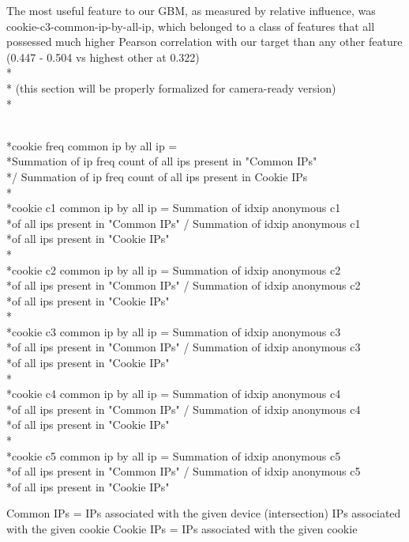 \documentclass[9pt, journal]{IEEEtran}
\begin{document}
The most useful feature to our GBM, as measured by relative influence, was cookie-c3-common-ip-by-all-ip, which belonged to a class of features that all possessed much higher Pearson correlation with our target than any other feature (0.447 - 0.504 vs highest other at 0.322)
\\*
\\* (this section will be properly formalized for camera-ready version)
\\*
\begin{footnotesize}
\\*cookie freq common ip by all ip = 
\\*Summation of ip freq count of all ips present in "Common IPs" 
\\*/ Summation of ip freq count of all ips present in Cookie IPs
\\*
\\*cookie c1 common ip by all ip = Summation of idxip anonymous c1 
\\*of all ips present in "Common IPs" / Summation of idxip anonymous c1 
\\*of all ips present in "Cookie IPs"
\\*
\\*cookie c2 common ip by all ip = Summation of idxip anonymous c2
\\*of all ips present in "Common IPs" / Summation of idxip anonymous c2
\\*of all ips present in "Cookie IPs"
\\*
\\*cookie c3 common ip by all ip = Summation of idxip anonymous c3
\\*of all ips present in "Common IPs" / Summation of idxip anonymous c3
\\*of all ips present in "Cookie IPs"
\\*
\\*cookie c4 common ip by all ip = Summation of idxip anonymous c4
\\*of all ips present in "Common IPs" / Summation of idxip anonymous c4 
\\*of all ips present in "Cookie IPs"
\\*
\\*cookie c5 common ip by all ip = Summation of idxip anonymous c5
\\*of all ips present in "Common IPs" / Summation of idxip anonymous c5
\\*of all ips present in "Cookie IPs"

Common IPs = IPs associated with the given device (intersection) IPs associated with the given cookie
Cookie IPs = IPs associated with the given cookie
\end{footnotesize}
\end{document}
